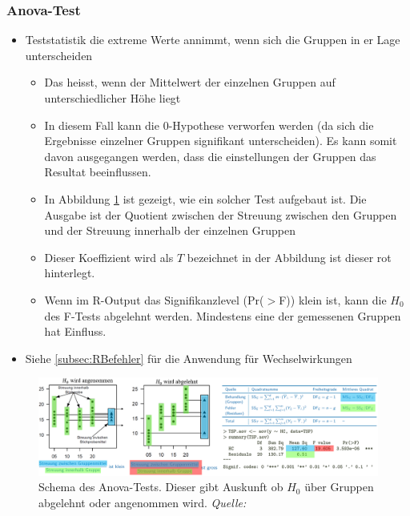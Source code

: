 \subsubsection{Anova-Test}
\label{subsubsec:AnovaTest}
\begin{itemize}
	\item Teststatistik die extreme Werte annimmt, wenn sich die Gruppen in er Lage unterscheiden
	\begin{itemize}
		\item Das heisst, wenn der Mittelwert der einzelnen Gruppen auf unterschiedlicher Höhe liegt
		\item In diesem Fall kann die 0-Hypothese verworfen werden (da sich die Ergebnisse einzelner Gruppen signifikant unterscheiden). Es kann somit davon ausgegangen werden, dass die einstellungen der Gruppen das Resultat beeinflussen. 
		\item In Abbildung \ref{fig:Anova} ist gezeigt, wie ein solcher Test aufgebaut ist. Die Ausgabe ist der Quotient zwischen der Streuung zwischen den Gruppen und der Streuung innerhalb der einzelnen Gruppen
		\item Dieser Koeffizient wird als $T$ bezeichnet in der Abbildung ist dieser rot hinterlegt. 
		\item Wenn im R-Output das Signifikanzlevel (Pr($>$F)) klein ist, kann die $H_0$ des F-Tests abgelehnt werden. Mindestens eine der gemessenen Gruppen hat Einfluss. 
	\end{itemize}
	\item Siehe \ref{subsec:RBefehler} für die Anwendung für Wechselwirkungen
\end{itemize}

\begin{figure}[!h]
	\centering
	\includegraphics[width=1\linewidth]{./figures/Anova.png}
	\caption{Schema des Anova-Tests. Dieser gibt Auskunft ob $H_0$ über Gruppen abgelehnt oder angenommen wird. \textit{Quelle:}\cite{C:Anova}}
	\label{fig:Anova}
\end{figure}

